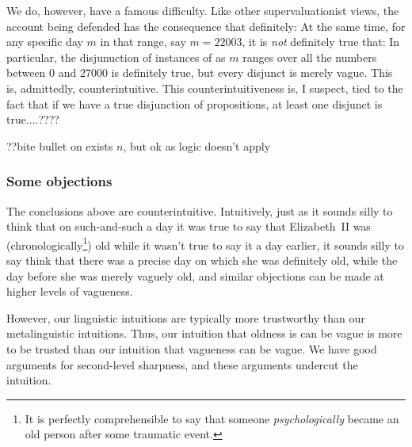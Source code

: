We do, however, have a famous difficulty. Like other supervaluationist views, the account being
defended has the consequence that definitely:
At the same time, for any specific day $m$ in that range, say $m=22003$, it is \textit{not} definitely true that:
In particular, the disjunuction of instances of  as $m$ ranges over all the numbers between $0$ and $27000$
is definitely true, but every disjunct is merely vague. This is, admittedly, counterintuitive. This counterintuitiveness
is, I suspect, tied to the fact that if we have a true disjunction of propositions, at least one disjunct is true....????



??bite bullet on exists $n$, but ok as logic doesn't apply

\subsubsection{Some objections}
The conclusions above are counterintuitive. Intuitively, just as it sounds silly to think that on such-and-such a day it was true
to say that Elizabeth~II was (chronologically\footnote{It is perfectly comprehensible to say that someone \textit{psychologically} 
became an old person after some traumatic event.}) old while it wasn't true to say it a day earlier, it sounds silly to say think
that there was a precise day on which she was definitely old, while the day before she was merely vaguely old, and similar objections
can be made at higher levels of vagueness.

However, our linguistic intuitions are typically more trustworthy than our metalinguistic intuitions. Thus, our intuition that oldness is
can be vague is more to be trusted than our intuition that vagueness can be vague. We have good arguments for second-level sharpness, and
these arguments undercut the intuition.

